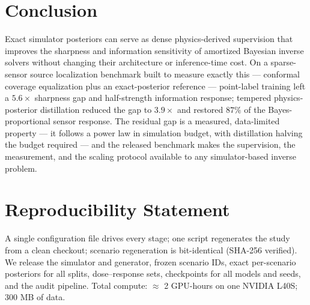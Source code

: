 \documentclass{article}
\begin{document}
\section{Conclusion}

Exact simulator posteriors can serve as dense physics-derived supervision that improves
the sharpness and information sensitivity of amortized Bayesian inverse solvers without
changing their architecture or inference-time cost. On a sparse-sensor source
localization benchmark built to measure exactly this --- conformal coverage equalization
plus an exact-posterior reference --- point-label training left a $5.6\times$
sharpness gap and half-strength information response; tempered physics-posterior distillation reduced
the gap to $3.9\times$ and restored $87\%$ of the Bayes-proportional sensor response.
The residual gap is a measured, data-limited property --- it follows a power law in
simulation budget, with distillation halving the budget required --- and the released
benchmark makes the supervision, the measurement, and the scaling protocol available to
any simulator-based inverse problem.

\section*{Reproducibility Statement}

A single configuration file drives every stage; one script regenerates the study from a
clean checkout; scenario regeneration is bit-identical (SHA-256 verified). We release the
simulator and generator, frozen scenario IDs, exact per-scenario posteriors for all
splits, dose--response sets, checkpoints for all models and seeds, and the audit pipeline.
Total compute: $\approx$ 2 GPU-hours on one NVIDIA L40S; 300 MB of data.
\end{document}
